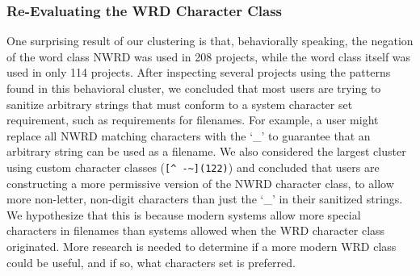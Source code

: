 \subsubsection{Re-Evaluating the WRD Character Class}
One surprising result of our clustering is that, behaviorally speaking, the negation of the word class NWRD was used in 208 projects, while the word class itself was used in only 114 projects. After inspecting several projects using the patterns found in this behavioral cluster, we concluded that most users are trying to sanitize arbitrary strings that must conform to a system character set requirement, such as requirements for filenames.  For example, a user might replace all NWRD matching characters with the `\_' to guarantee that an arbitrary string can be used as a filename.  We also considered the largest cluster using custom character classes (\verb•[^ -~](122)•) and concluded that users are constructing a more permissive version of the NWRD character class, to allow more non-letter, non-digit characters than just the `\_' in their sanitized strings.  We hypothesize that this is because modern systems allow more special characters in filenames than systems allowed when the WRD character class originated.  More research is needed to determine if a more modern WRD class could be useful, and if so, what characters set is preferred.


